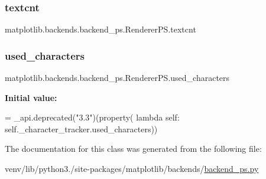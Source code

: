 \subsubsection{\texorpdfstring{textcnt}{textcnt}}
{\footnotesize\ttfamily matplotlib.\+backends.\+backend\+\_\+ps.\+Renderer\+P\+S.\+textcnt}

\mbox{\label{classmatplotlib_1_1backends_1_1backend__ps_1_1RendererPS_aeb5c34d9f46f2a11b7807b7dbdd3bf08}} 
\subsubsection{\texorpdfstring{used\+\_\+characters}{used\_characters}}
{\footnotesize\ttfamily matplotlib.\+backends.\+backend\+\_\+ps.\+Renderer\+P\+S.\+used\+\_\+characters\hspace{0.3cm}{\ttfamily [static]}}

{\bfseries Initial value\+:}
\begin{DoxyCode}
=  \_api.deprecated(\textcolor{stringliteral}{"3.3"})(property(
        \textcolor{keyword}{lambda} self: self.\_character\_tracker.used\_characters))
\end{DoxyCode}


The documentation for this class was generated from the following file\+:\begin{DoxyCompactItemize}
\item 
venv/lib/python3./site-\/packages/matplotlib/backends/\hyperlink{backend__ps_8py}{backend\+\_\+ps.\+py}\end{DoxyCompactItemize}
